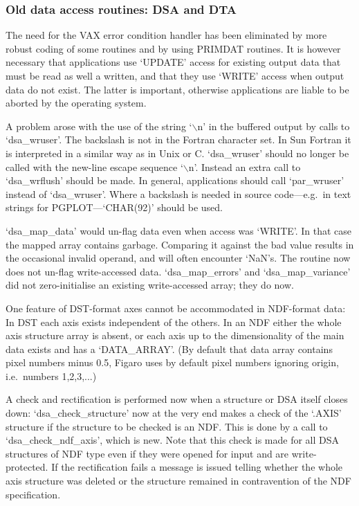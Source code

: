 \documentclass[11pt,twoside]{article}
\newcommand{\latorhtm}[2]{#1}
\newcommand{\latorhtm}[2]{#2}
\begin{document}
\subsubsection{\label{changessub6}Old data access routines: DSA and DTA}

   The need for the VAX error condition handler has been eliminated by
   more robust coding of some routines and by using PRIMDAT routines. It
   is however necessary that applications use `UPDATE' access for
   existing output data that must be read as well a written, and that
   they use `WRITE' access when output data do not exist. The latter is
   important, otherwise applications are liable to be aborted by the
   operating system.

   A problem arose with the use of the string `$\backslash$n' in the buffered
   output by calls to `dsa\_wruser'. The backslash is not in the Fortran
   character set. In Sun Fortran it is interpreted in a similar way as
   in Unix or C.  `dsa\_wruser' should no longer be called with the
   new-line escape sequence `$\backslash$n'. Instead an extra call to
   `dsa\_wrflush'
   should be made. In general, applications should call `par\_wruser'
   instead of `dsa\_wruser'. Where a backslash is needed in source
   code\latorhtm{---}{-}e.g.\ in text strings for
   PGPLOT\latorhtm{---}{-}`CHAR(92)' should be used.

   `dsa\_map\_data' would un-flag data even when access was `WRITE'. In
   that case the mapped array contains garbage. Comparing it against the
   bad value results in the occasional invalid operand, and will often
   encounter `NaN's. The routine now does not un-flag write-accessed
   data.  `dsa\_map\_errors' and `dsa\_map\_variance' did not
   zero-initialise an existing write-accessed array; they do now.

   One feature of DST-format axes cannot be accommodated in NDF-format
   data: In DST each axis exists independent of the others. In an NDF
   either the whole axis structure array is absent, or each axis up to
   the dimensionality of the main data exists and has a `DATA\_ARRAY'.
   (By default that data array contains pixel numbers minus 0.5, Figaro
   uses by default pixel numbers ignoring origin, i.e.\ numbers
   1,2,3,...)

   A check and rectification is performed now when a
   structure or DSA itself closes down: `dsa\_\-check\-\_structure' now at the
   very end makes a check of the `.AXIS' structure if the structure to
   be checked is an NDF. This is done by a call to `dsa\_check\_ndf\_axis',
   which is new. Note that this check is made for all DSA structures of
   NDF type even if they were opened for input and are write-protected.
   If the rectification fails a message is issued telling whether the
   whole axis structure was deleted or the structure remained in
   contravention of the NDF specification.
\end{document}
